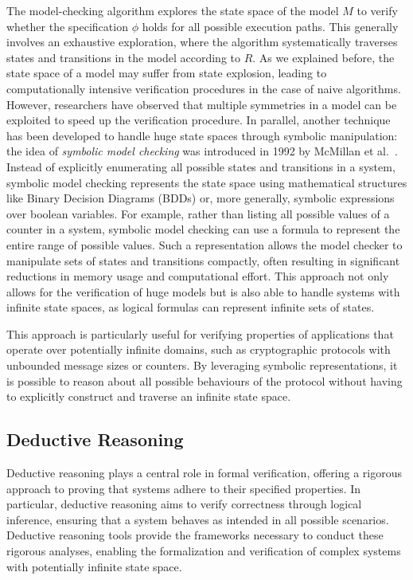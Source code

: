 The model-checking algorithm explores the state space of the model $M$ to verify whether the specification $\phi$ holds for all possible execution paths. This generally involves an exhaustive exploration, where the algorithm systematically traverses states and transitions in the model according to $R$. As we explained before, the state space of a model may suffer from state explosion, leading to computationally intensive verification procedures in the case of naive algorithms. However, researchers have observed that multiple symmetries in a model can be exploited to speed up the verification procedure. In parallel, another technique has been developed to handle huge state spaces through symbolic manipulation: the idea of \textit{symbolic model checking} was introduced in 1992 by McMillan et al.~\cite{symbolicmc}. Instead of explicitly enumerating all possible states and transitions in a system, symbolic model checking represents the state space using mathematical structures like Binary Decision Diagrams (BDDs) or, more generally, symbolic expressions over boolean variables. For example, rather than listing all possible values of a counter in a system, symbolic model checking can use a formula to represent the entire range of possible values. Such a representation allows the model checker to manipulate sets of states and transitions compactly, often resulting in significant reductions in memory usage and computational effort. This approach not only allows for the verification of huge models but is also able to handle systems with infinite state spaces, as logical formulas can represent infinite sets of states.

This approach is particularly useful for verifying properties of applications that operate over potentially infinite domains, such as cryptographic protocols with unbounded message sizes or counters. By leveraging symbolic representations, it is possible to reason about all possible behaviours of the protocol without having to explicitly construct and traverse an infinite state space.

\subsection{Deductive Reasoning}

Deductive reasoning plays a central role in formal verification, offering a rigorous approach to proving that systems adhere to their specified properties. In particular, deductive reasoning aims to verify correctness through logical inference, ensuring that a system behaves as intended in all possible scenarios. Deductive reasoning tools provide the frameworks necessary to conduct these rigorous analyses, enabling the formalization and verification of complex systems with potentially infinite state space.

